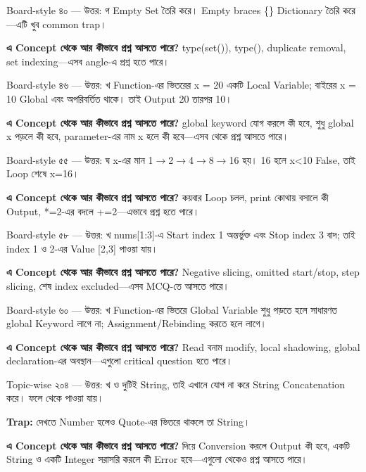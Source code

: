 \begin{explainbox}{Board-style ৪০ — উত্তর: গ}
 Empty Set তৈরি করে। Empty braces \textenglish{\ttfamily \{\}} Dictionary তৈরি করে—এটি খুব common trap।

\textbf{এ Concept থেকে আর কীভাবে প্রশ্ন আসতে পারে?} type(set()), type({}), duplicate removal, set indexing—এসব angle-এ প্রশ্ন হতে পারে।
\end{explainbox}

\begin{explainbox}{Board-style ৪৬ — উত্তর: খ}
Function-এর ভিতরের x = 20 একটি Local Variable; বাইরের x = 10 Global এবং অপরিবর্তিত থাকে। তাই Output 20 তারপর 10।

\textbf{এ Concept থেকে আর কীভাবে প্রশ্ন আসতে পারে?} global keyword যোগ করলে কী হবে, শুধু global x পড়লে কী হবে, parameter-এর নাম x হলে কী হবে—এসব থেকে প্রশ্ন আসতে পারে।
\end{explainbox}

\begin{explainbox}{Board-style ৫৫ — উত্তর: ঘ}
x-এর মান 1\(\rightarrow\)2\(\rightarrow\)4\(\rightarrow\)8\(\rightarrow\)16 হয়। 16 হলে x<10 False, তাই Loop শেষে x=16।

\textbf{এ Concept থেকে আর কীভাবে প্রশ্ন আসতে পারে?} কয়বার Loop চলল, print কোথায় বসালে কী Output, *=2-এর বদলে +=2—এভাবে প্রশ্ন হতে পারে।
\end{explainbox}

\begin{explainbox}{Board-style ৫৮ — উত্তর: খ}
nums[1:3]-এ Start index 1 অন্তর্ভুক্ত এবং Stop index 3 বাদ; তাই index 1 ও 2-এর Value [2,3] পাওয়া যায়।

\textbf{এ Concept থেকে আর কীভাবে প্রশ্ন আসতে পারে?} Negative slicing, omitted start/stop, step slicing, শেষ index excluded—এসব MCQ-তে আসতে পারে।
\end{explainbox}

\begin{explainbox}{Board-style ৬০ — উত্তর: খ}
Function-এর ভিতরে Global Variable শুধু পড়তে হলে সাধারণত global Keyword লাগে না; Assignment/Rebinding করতে হলে লাগে।

\textbf{এ Concept থেকে আর কীভাবে প্রশ্ন আসতে পারে?} Read বনাম modify, local shadowing, global declaration-এর অবস্থান—এগুলো critical question হতে পারে।
\end{explainbox}

\begin{explainbox}{Topic-wise ২০৪ — উত্তর: খ}
 ও  দুটিই String, তাই \py{+} এখানে যোগ না করে String Concatenation করে। ফলে  থেকে  পাওয়া যায়।

\textbf{Trap:} দেখতে Number হলেও Quote-এর ভিতরে থাকলে তা String।

\textbf{এ Concept থেকে আর কীভাবে প্রশ্ন আসতে পারে?}  দিয়ে Conversion করলে Output কী হবে, একটি String ও একটি Integer সরাসরি \py{+} করলে কী Error হবে—এগুলো থেকেও প্রশ্ন আসতে পারে।
\end{explainbox}


